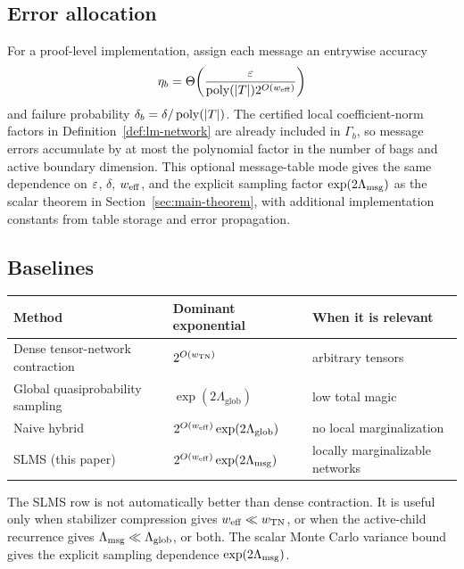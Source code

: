 \subsection{Error allocation}

For a proof-level implementation, assign each message an entrywise accuracy
\[
\eta_b=\Theta\!\left(\frac{\varepsilon}{\operatorname{poly}(|T|)2^{O(w_{\mathrm{eff}})}}\right)
\]
and failure probability \(\delta_b=\delta/\operatorname{poly}(|T|)\). The certified local coefficient-norm factors in Definition~\ref{def:lm-network} are already included in \(\Gamma_b\), so message errors accumulate by at most the polynomial factor in the number of bags and active boundary dimension. This optional message-table mode gives the same dependence on \(\varepsilon\), \(\delta\), \(w_{\mathrm{eff}}\), and the explicit sampling factor \(\exp(2\Lambda_{\mathrm{msg}})\) as the scalar theorem in Section~\ref{sec:main-theorem}, with additional implementation constants from table storage and error propagation.

\subsection{Baselines}

\begin{center}
\begin{tabular}{lll}
\toprule
Method & Dominant exponential & When it is relevant \\
\midrule
Dense tensor-network contraction & \(2^{O(w_{\mathrm{TN}})}\) & arbitrary tensors \\
Global quasiprobability sampling & \(\exp(2\Lambda_{\mathrm{glob}})\) & low total magic \\
Naive hybrid & \(2^{O(w_{\mathrm{eff}})}\exp(2\Lambda_{\mathrm{glob}})\) & no local marginalization \\
SLMS (this paper) & \(2^{O(w_{\mathrm{eff}})}\exp(2\Lambda_{\mathrm{msg}})\) & locally marginalizable networks \\
\bottomrule
\end{tabular}
\end{center}

The SLMS row is not automatically better than dense contraction. It is useful only when stabilizer compression gives \(w_{\mathrm{eff}}\ll w_{\mathrm{TN}}\), or when the active-child recurrence gives \(\Lambda_{\mathrm{msg}}\ll\Lambda_{\mathrm{glob}}\), or both. The scalar Monte Carlo variance bound gives the explicit sampling dependence \(\exp(2\Lambda_{\mathrm{msg}})\).
